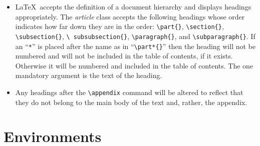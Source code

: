 \begin{itemize}
\item \LaTeX~accepts the definition of a document hierarchy and displays
  headings appropriately. The \textit{article} class accepts the following
  headings whose order indicates how far down they are in the order:
  \texttt{\textbackslash part\{\}}, \texttt{\textbackslash section\{\}},
  \texttt{\textbackslash subsection\{\}}, \texttt{\textbackslash
    subsubsection\{\}}, \texttt{\textbackslash paragraph\{\}}, and
  \texttt{\textbackslash subparagraph\{\}}. If an ``\texttt{*}'' is placed after
  the name as in ``\texttt{\textbackslash part*\{\}}'' then the heading will not
  be numbered and will not be included in the table of contents, if it
  exists. Otherwise it will be numbered and included in the table of
  contents. The one mandatory argument is the text of the heading.

\item Any headings after the \verb=\appendix= command will be altered to reflect
  that they do not belong to the main body of the text and, rather, the
  appendix.


\end{itemize}

\section{Environments}

